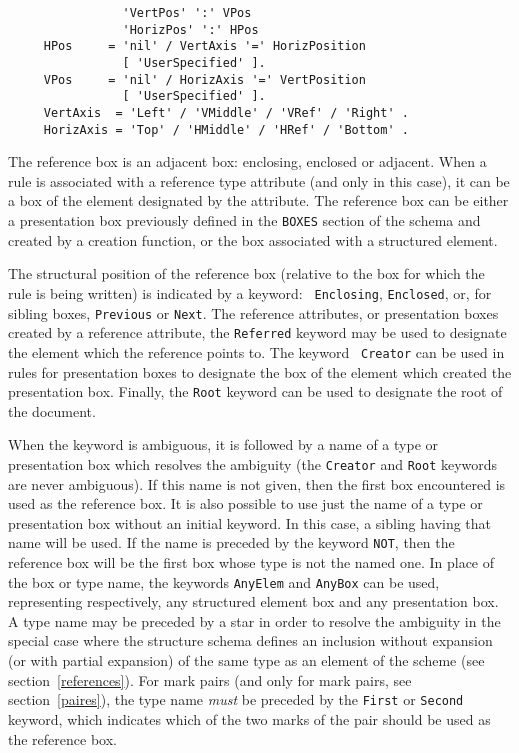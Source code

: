 \begin{verbatim}
                'VertPos' ':' VPos
                'HorizPos' ':' HPos
     HPos     = 'nil' / VertAxis '=' HorizPosition
                [ 'UserSpecified' ].
     VPos     = 'nil' / HorizAxis '=' VertPosition
                [ 'UserSpecified' ].
     VertAxis  = 'Left' / 'VMiddle' / 'VRef' / 'Right' .
     HorizAxis = 'Top' / 'HMiddle' / 'HRef' / 'Bottom' .
\end{verbatim}

The reference box is an adjacent box: enclosing, enclosed or adjacent.
When a rule is associated with a reference type attribute (and only in
this case), it can be a box of the element designated by the
attribute.  The reference box can be either a presentation box
previously defined in the {\tt BOXES} section of the schema and
created by a creation function, or the box associated with a
structured element.

The structural position of the reference box (relative to the box for
which the rule is being written) is indicated by a keyword: {\tt
Enclosing}, {\tt Enclosed}, or, for sibling boxes, {\tt Previous} or
{\tt Next}.  The reference attributes, or presentation boxes created
by a reference attribute, the {\tt Referred} keyword may be used to
designate the element which the reference points to.  The keyword {\tt
Creator} can be used in rules for presentation boxes to designate the
box of the element which created the presentation box.  Finally, the {\tt Root}
keyword can be used to designate the root of the document.

When the keyword is ambiguous, it is followed by a name of a type or
presentation box which resolves the ambiguity (the {\tt Creator} and
{\tt Root} keywords are never ambiguous).  If this name is not given,
then the first box encountered is used as the reference box. It is
also possible to use just the name of a type or presentation box
without an initial keyword.  In this case, a sibling having that name
will be used.  If the name is preceded by the keyword {\tt NOT}, then
the reference box will be the first box whose type is not the named
one.  In place of the box or type name, the keywords {\tt AnyElem} and
{\tt AnyBox} can be used, representing respectively, any structured
element box and any presentation box.  A type name may be preceded by
a star in order to resolve the ambiguity in the special case where the
structure schema defines an inclusion without expansion (or with
partial expansion) of the same type as an element of the scheme (see
section~\ref{references}).  For mark pairs (and only for mark pairs,
see section~\ref{paires}), the type name {\em must} be preceded by the
{\tt First} or {\tt Second} keyword, which indicates which of the two
marks of the pair  should be used as the reference box.

